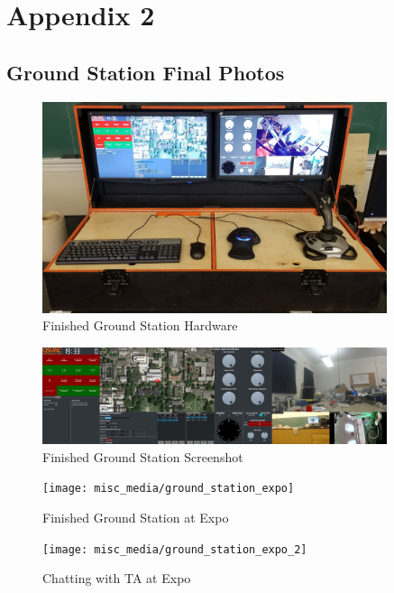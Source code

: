 \section{Appendix 2}
\subsection{Ground Station Final Photos}
\begin{figure}[h!]
  \centering
  \captionsetup{justification=centering}
  \includegraphics[width=0.9\textwidth]{misc_media/ground_station_framed}
  \caption{Finished Ground Station Hardware}
\end{figure}

\begin{figure}[h!]
  \centering
  \captionsetup{justification=centering}
  \includegraphics[width=0.9\textwidth]{misc_media/ground_station_screenshot}
  \caption{Finished Ground Station Screenshot}
\end{figure}

\begin{figure}[h!]
  \centering
  \captionsetup{justification=centering}
  \texttt{[image: misc\_media/ground\_station\_expo]}
  \caption{Finished Ground Station at Expo}
\end{figure}

\begin{figure}[h!]
  \centering
  \captionsetup{justification=centering}
  \texttt{[image: misc\_media/ground\_station\_expo\_2]}
  \caption{Chatting with TA at Expo}
\end{figure}